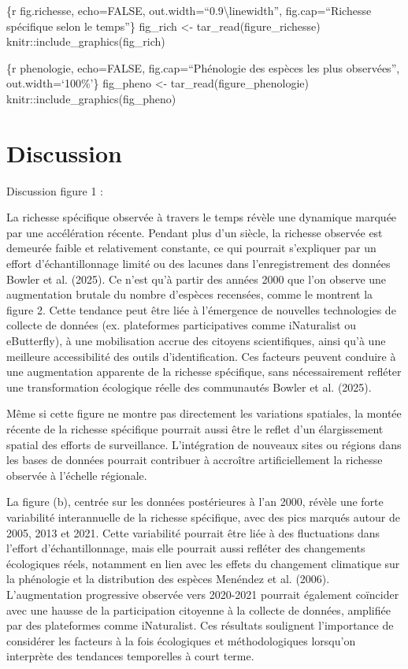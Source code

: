 \documentclass[9pt,twocolumn,twoside,]{pnas-new}
\begin{document}
\{r fig.richesse, echo=FALSE, out.width=``0.9\textbackslash linewidth'',
fig.cap=``Richesse spécifique selon le temps''\} fig\_rich \textless-
tar\_read(figure\_richesse) knitr::include\_graphics(fig\_rich)

\{r phenologie, echo=FALSE, fig.cap=``Phénologie des espèces les plus
observées'', out.width=`100\%'\} fig\_pheno \textless-
tar\_read(figure\_phenologie) knitr::include\_graphics(fig\_pheno)

\section*{Discussion}\label{discussion}

Discussion figure 1 :

La richesse spécifique observée à travers le temps révèle une dynamique
marquée par une accélération récente. Pendant plus d'un siècle, la
richesse observée est demeurée faible et relativement constante, ce qui
pourrait s'expliquer par un effort d'échantillonnage limité ou des
lacunes dans l'enregistrement des données Bowler et al. (2025). Ce n'est
qu'à partir des années 2000 que l'on observe une augmentation brutale du
nombre d'espèces recensées, comme le montrent la figure 2. Cette
tendance peut être liée à l'émergence de nouvelles technologies de
collecte de données (ex. plateformes participatives comme iNaturalist ou
eButterfly), à une mobilisation accrue des citoyens scientifiques, ainsi
qu'à une meilleure accessibilité des outils d'identification. Ces
facteurs peuvent conduire à une augmentation apparente de la richesse
spécifique, sans nécessairement refléter une transformation écologique
réelle des communautés Bowler et al. (2025).

Même si cette figure ne montre pas directement les variations spatiales,
la montée récente de la richesse spécifique pourrait aussi être le
reflet d'un élargissement spatial des efforts de surveillance.
L'intégration de nouveaux sites ou régions dans les bases de données
pourrait contribuer à accroître artificiellement la richesse observée à
l'échelle régionale.

La figure (b), centrée sur les données postérieures à l'an 2000, révèle
une forte variabilité interannuelle de la richesse spécifique, avec des
pics marqués autour de 2005, 2013 et 2021. Cette variabilité pourrait
être liée à des fluctuations dans l'effort d'échantillonnage, mais elle
pourrait aussi refléter des changements écologiques réels, notamment en
lien avec les effets du changement climatique sur la phénologie et la
distribution des espèces Menéndez et al. (2006). L'augmentation
progressive observée vers 2020-2021 pourrait également coïncider avec
une hausse de la participation citoyenne à la collecte de données,
amplifiée par des plateformes comme iNaturalist. Ces résultats
soulignent l'importance de considérer les facteurs à la fois écologiques
et méthodologiques lorsqu'on interprète des tendances temporelles à
court terme.
\end{document}
